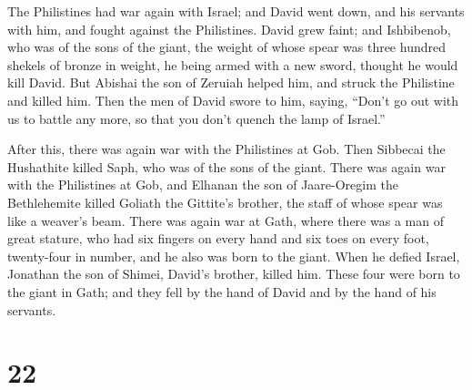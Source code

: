  The Philistines had war again with Israel; and David
went down, and his servants with him, and fought against the
Philistines. David grew faint;  and Ishbibenob, who was
of the sons of the giant, the weight of whose spear was three hundred
shekels of bronze in weight, he being armed with a new sword, thought he
would kill David.  But Abishai the son of Zeruiah helped
him, and struck the Philistine and killed him. Then the men of David
swore to him, saying, ``Don't go out with us to battle any more, so that
you don't quench the lamp of Israel.''

 After this, there was again war with the Philistines at
Gob. Then Sibbecai the Hushathite killed Saph, who was of the sons of
the giant.  There was again war with the Philistines at
Gob, and Elhanan the son of Jaare-Oregim the Bethlehemite killed Goliath
the Gittite's brother, the staff of whose spear was like a weaver's
beam.  There was again war at Gath, where there was a man
of great stature, who had six fingers on every hand and six toes on
every foot, twenty-four in number, and he also was born to the giant.
 When he defied Israel, Jonathan the son of Shimei,
David's brother, killed him.  These four were born to the
giant in Gath; and they fell by the hand of David and by the hand of his
servants.

\hypertarget{section-21}{%
\section{22}\label{section-21}}

